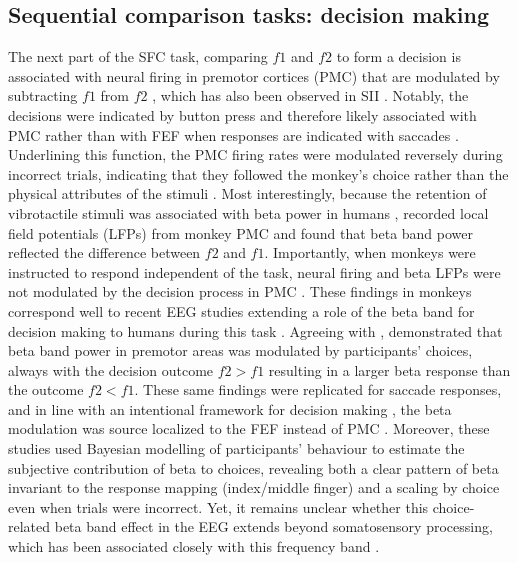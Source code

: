 \subsection{Sequential comparison tasks: decision making}
The next part of the SFC task, comparing $f1$ and $f2$ to form a decision is associated with neural firing in premotor cortices (PMC) that are modulated by subtracting $f1$ from $f2$ \parencite{Hernandez2010,Hernandez2002,Jun2010,Romo2004}, which has also been observed in SII \parencite{Romo2002}. Notably, the decisions were indicated by button press and therefore likely associated with PMC rather than with FEF when responses are indicated with saccades \parencite[see also][]{Gold2007}. Underlining this function, the PMC firing rates were modulated reversely during incorrect trials, indicating that they followed the monkey’s choice rather than the physical attributes of the stimuli \parencite{Hernandez2002,Romo2004}. Most interestingly, because the retention of vibrotactile stimuli was associated with beta power in humans \parencite{Spitzer2010}, \textcite{Haegens2011} recorded local field potentials (LFPs) from monkey PMC and found that beta band power reflected the difference between $f2$ and $f1$. Importantly, when monkeys were instructed to respond independent of the task, neural firing and beta LFPs were not modulated by the decision process in PMC \parencite[see also][]{Haegens2017}. These findings in monkeys correspond well to recent EEG studies extending a role of the beta band for decision making to humans during this task \parencite{Herding2016,Herding2017}. Agreeing with \textcite{Haegens2011}, \textcite{Herding2016} demonstrated that beta band power in premotor areas was modulated by participants’ choices, always with the decision outcome $f2>f1$ resulting in a larger beta response than the outcome $f2<f1$. These same findings were replicated for saccade responses, and in line with an intentional framework for decision making \parencite{Shadlen2008}, the beta modulation was source localized to the FEF instead of PMC \parencite{Herding2017}. Moreover, these studies used Bayesian modelling of participants’ behaviour to estimate the subjective contribution of beta to choices, revealing both a clear pattern of beta invariant to the response mapping (index/middle finger) and a scaling by choice even when trials were incorrect. Yet, it remains unclear whether this choice-related beta band effect in the EEG extends beyond somatosensory processing, which has been associated closely with this frequency band \parencite{Pfurtscheller1981}. 

